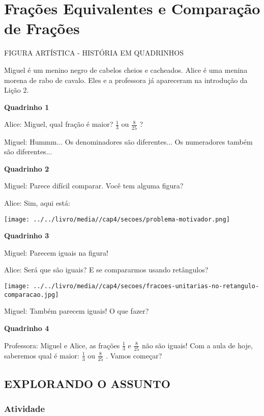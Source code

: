 \documentclass[a4,12pt]{book}
\begin{document}
\chapter{Frações Equivalentes e Comparação de Frações }

\begin{imagem*}[breakable]{}{}   FIGURA ARTÍSTICA -  
  HISTÓRIA EM QUADRINHOS  
  
  Miguel é um menino negro de cabelos cheios e cacheados. Alice é uma menina morena de rabo de cavalo. Eles e a professora já apareceram na introdução da Lição 2.  
  
  {\bf Quadrinho 1}  
  
  Alice: Miguel, qual fração é maior?   $\frac{1}{3}$   ou   $\frac{8}{25}$  ?  
  
  Miguel: Hummm... Os denominadores são diferentes... Os numeradores também são diferentes...  
  
  {\bf Quadrinho 2}  
  
  Miguel: Parece difícil comparar. Você tem alguma figura?  
  
  Alice: Sim, aqui está:  
  
    \texttt{[image: ../../livro/media//cap4/secoes/problema-motivador.png]}  
  
  {\bf Quadrinho 3}  
  
  Miguel: Parecem iguais na figura!  
  
  Alice: Será que são iguais? E se compararmos usando retângulos?  
  
    \texttt{[image: ../../livro/media//cap4/secoes/fracoes-unitarias-no-retangulo-comparacao.jpg]}  
  
  Miguel: Também parecem iguais! O que fazer?  
     
  {\bf Quadrinho 4}  
  
  Professora: Miguel e Alice, as frações   $\frac{1}{3}$   e   $\frac{8}{25}$   não são iguais! Com a aula de hoje, saberemos qual é maior:    $\frac{1}{3}$   ou   $\frac{8}{25}$  . Vamos começar?  
\end{imagem*}


\section{EXPLORANDO O ASSUNTO }

\subsection{Atividade}
\end{document}
